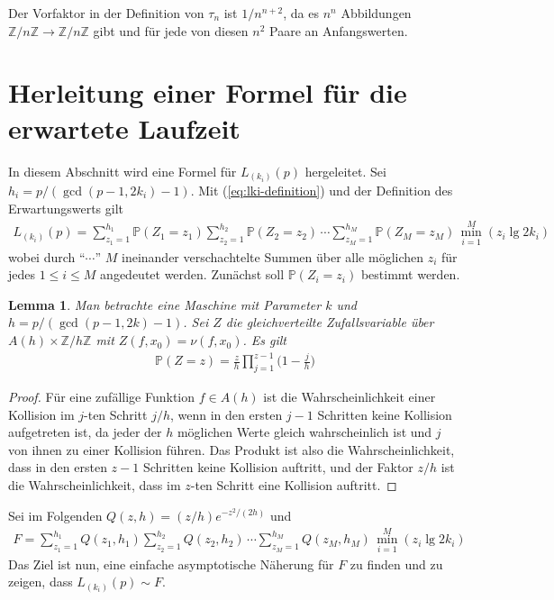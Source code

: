 \documentclass[a4paper, 11pt, ngerman]{article}
\newcommand{\Z}{\mathbb{Z}}
\renewcommand{\P}{\mathbb{P}}
\theoremstyle{definition}
\theoremstyle{plain}
\newtheorem{lemma}{Lemma}
\theoremstyle{remark}
\begin{document}
Der Vorfaktor in der Definition von $\tau_n$ ist $1/n^{n + 2}$, da es $n^n$ Abbildungen $\Z/n\Z \to \Z/n\Z$ gibt und für jede von diesen $n^2$ Paare an Anfangswerten.

\section{Herleitung einer Formel für die erwartete Laufzeit}
\label{sec:formula-running-time}

In diesem Abschnitt wird eine Formel für $L_{(k_i)}(p)$ hergeleitet. Sei $h_i = p/(\gcd(p - 1, 2k_i) - 1)$. Mit (\ref{eq:lki-definition}) und der Definition des Erwartungswerts gilt
\begin{align}
    L_{(k_i)}(p) =
    \sum_{z_1 = 1}^{h_1} \P(Z_1 = z_1)
    \sum_{z_2 = 1}^{h_2} \P(Z_2 = z_2) \, \cdots
    \sum_{z_M = 1}^{h_M} \P(Z_M = z_M)
    \, \min_{i = 1}^M(z_i \lg 2k_i)
    \label{eq:lki-written-out}
\end{align}
wobei durch "`$\cdots$"' $M$ ineinander verschachtelte Summen über alle möglichen $z_i$ für jedes $1 \le i \le M$ angedeutet werden. Zunächst soll $\P(Z_i = z_i)$ bestimmt werden.

\begin{lemma}
    Man betrachte eine Maschine mit Parameter $k$ und $h = p/(\gcd(p - 1, 2k) - 1)$. Sei $Z$ die gleichverteilte Zufallsvariable über $A(h) \times \Z/h\Z$ mit $Z(f, x_0) = \nu(f, x_0)$. Es gilt
    \begin{align*}
        \P(Z = z) = \frac z h \prod_{j = 1}^{z - 1} \bigg (1 - \frac j h \bigg )
    \end{align*}

    \label{lemma:prob-s-z}
\end{lemma}

\begin{proof}
    Für eine zufällige Funktion $f \in A(h)$ ist die Wahrscheinlichkeit einer Kollision im $j$-ten Schritt $j/h$, wenn in den ersten $j - 1$ Schritten keine Kollision aufgetreten ist, da jeder der $h$ möglichen Werte gleich wahrscheinlich ist und $j$ von ihnen zu einer Kollision führen. Das Produkt ist also die Wahrscheinlichkeit, dass in den ersten $z - 1$ Schritten keine Kollision auftritt, und der Faktor $z/h$ ist die Wahrscheinlichkeit, dass im $z$-ten Schritt eine Kollision auftritt.
\end{proof}

Sei im Folgenden $Q(z, h) = (z/h) e^{-z^2/(2h)}$ und
\begin{align}
    F =
    \sum_{z_1 = 1}^{h_1} Q(z_1, h_1)
    \sum_{z_2 = 1}^{h_2} Q(z_2, h_2) \, \cdots
    \sum_{z_M = 1}^{h_M} Q(z_M, h_M)
    \, \min_{i = 1}^M(z_i \lg 2k_i)
    \label{eq:f-definition}
\end{align}
Das Ziel ist nun, eine einfache asymptotische Näherung für $F$ zu finden und zu zeigen, dass $L_{(k_i)}(p) \sim F$.
\end{document}
